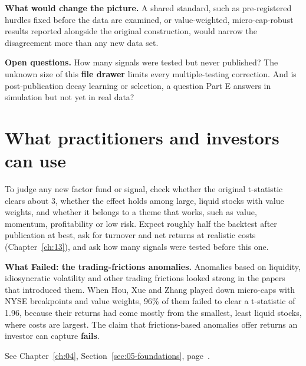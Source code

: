 \textbf{What would change the picture.} A shared standard, such as pre-registered hurdles fixed before the data are examined, or value-weighted, micro-cap-robust results reported alongside the original construction, would narrow the disagreement more than any new data set.

\label{sec:19-open}
\textbf{Open questions.} How many signals were tested but never published? The unknown size of this \textbf{file drawer} limits every multiple-testing correction. And is post-publication decay learning or selection, a question Part E answers in simulation but not yet in real data?

\section{What practitioners and investors can use}
\label{sec:19-investors}

To judge any new factor fund or signal, check whether the original t-statistic clears about 3, whether the effect holds among large, liquid stocks with value weights, and whether it belongs to a theme that works, such as value, momentum, profitability or low risk. Expect roughly half the backtest after publication at best, ask for turnover and net returns at realistic costs (Chapter~\ref{ch:13}), and ask how many signals were tested before this one.

\begin{callout}
\textbf{What Failed: the trading-frictions anomalies.} Anomalies based on liquidity, idiosyncratic volatility and other trading frictions looked strong in the papers that introduced them. When Hou, Xue and Zhang played down micro-caps with NYSE breakpoints and value weights, 96\% of them failed to clear a t-statistic of 1.96, because their returns had come mostly from the smallest, least liquid stocks, where costs are largest. The claim that frictions-based anomalies offer returns an investor can capture \textbf{fails}.
\end{callout}

\makeatletter
{}
\makeatother

\begin{keyterms}
\small
\begin{description}[leftmargin=0pt, itemsep=2pt, parsep=0pt, font=\normalfont\bfseries\color{FEMaroon}]
  \item[Portfolio sort.] See Chapter~\ref{ch:04}, Section~\ref{sec:05-foundations}, page~\pageref{sec:05-foundations}.
\end{description}
\end{keyterms}
